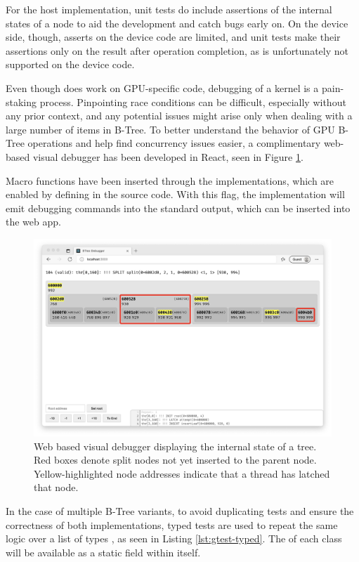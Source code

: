 For the host implementation, unit tests do include assertions of the internal states of a node to aid the development and catch bugs early on. On the device side, though, asserts on the device code are limited, and unit tests make their assertions only on the result after operation completion, as  is unfortunately not supported on the device code.

Even though  does work on GPU-specific code, debugging of a kernel is a pain-staking process. Pinpointing race conditions can be difficult, especially without any prior context, and any potential issues might arise only when dealing with a large number of items in B-Tree. To better understand the behavior of GPU B-Tree operations and help find concurrency issues easier, a complimentary web-based visual debugger has been developed in React, seen in Figure \ref{figure:debugger}.

Macro functions have been inserted through the implementations, which are enabled by defining  in the source code. With this flag, the implementation will emit debugging commands into the standard output, which can be inserted into the web app.

\begin{figure}
  \centering
  \includegraphics[width=\textwidth]{components/figure/debugger.png}
  \caption{Web based visual debugger displaying the internal state of a tree. Red boxes denote split nodes not yet inserted to the parent node. Yellow-highlighted node addresses indicate that a thread has latched that node.}
  \label{figure:debugger}
\end{figure}

In the case of multiple B-Tree variants, to avoid duplicating tests and ensure the correctness of both implementations, typed tests are used to repeat the same logic over a list of types \cite{gtest-advanced}, as seen in Listing \ref{lst:gtest-typed}. The  of each class will be available as a static field within  itself.

